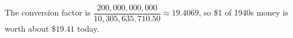The conversion factor is $\dfrac{200{,}000{,}000{,}000}{10{,}305{,}635{,}710.50}\approx19.4069$, so \$1 of 1940s money is worth about $\boxed{\$19.41}$ today.
